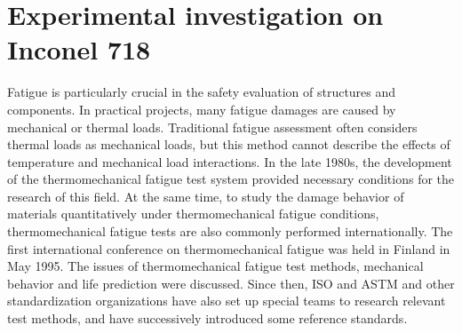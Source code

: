 \chapter{Experimental investigation on Inconel 718}

\noindent
Fatigue is particularly crucial in the safety evaluation of structures and components. In practical projects, many fatigue damages are caused by mechanical or thermal loads. Traditional fatigue assessment often considers thermal loads as mechanical loads, but this method cannot describe the effects of temperature and mechanical load interactions. In the late 1980s, the development of the thermomechanical fatigue test system provided necessary conditions for the research of this field. At the same time, to study the damage behavior of materials quantitatively under thermomechanical fatigue conditions, thermomechanical fatigue tests are also commonly performed internationally. The first international conference on thermomechanical fatigue was held in Finland in May 1995. The issues of thermomechanical fatigue test methods, mechanical behavior and life prediction were discussed. Since then, ISO and ASTM and other standardization organizations have also set up special teams to research relevant test methods, and have successively introduced some reference standards.


